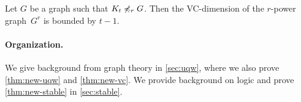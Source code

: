 \begin{theorem}\label{thm:new-vc}
Let $G$ be a graph such that $K_t\not\preccurlyeq_r G$. Then the
VC-dimension of the $r$-power graph~$G^r$ is bounded by $t-1$. 
\end{theorem}

\paragraph{Organization.} We give background from graph theory in \cref{sec:uqw}, where we also
prove \cref{thm:new-uqw} and \cref{thm:new-vc}. We provide background 
on logic and prove \cref{thm:new-stable} in \cref{sec:stable}. 



